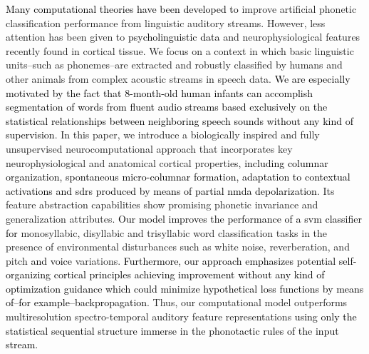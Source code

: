 \documentclass[10pt,letterpaper]{article}
\newcommand{\reviewertwo}[1]{\textcolor{black}{#1}}
\newcommand{\reviewerfour}[1]{\textcolor{black}{#1}}
\begin{document}
\reviewertwo{Many computational theories have been developed to} improve artificial phonetic classification performance from linguistic auditory streams. However, less attention has been given to \reviewerfour{psycholinguistic data} and neurophysiological features recently found in cortical tissue. We focus on a context in which basic linguistic units–such as phonemes–are extracted and robustly classified by humans and other animals from complex acoustic streams in speech data. \reviewerfour{We are especially motivated by the fact that 8-month-old human infants can accomplish segmentation of words from fluent audio streams based exclusively on the statistical relationships between neighboring speech sounds without any kind of supervision}. In this paper, we introduce a biologically inspired and fully unsupervised neurocomputational approach that incorporates key neurophysiological and anatomical cortical properties, \reviewertwo{including columnar organization, spontaneous micro-columnar formation, adaptation to contextual activations and {\glspl{sdr}} produced by means of partial \gls{nmda} depolarization}. Its feature abstraction capabilities show promising phonetic invariance and generalization attributes. \reviewertwo{Our model improves the performance of a \gls{svm} classifier for} monosyllabic, disyllabic and trisyllabic word classification tasks in the presence of environmental disturbances such as white noise, reverberation, and pitch \reviewerfour{and voice} variations. \reviewerfour{Furthermore, our approach emphasizes potential self-organizing cortical principles achieving improvement without any kind of optimization guidance which could minimize hypothetical loss functions by means of--for example--backpropagation}. Thus, our computational model outperforms multiresolution spectro-temporal auditory feature representations \reviewerfour{using only the statistical sequential structure immerse in the phonotactic rules of the input stream}.

%


\end{document}
